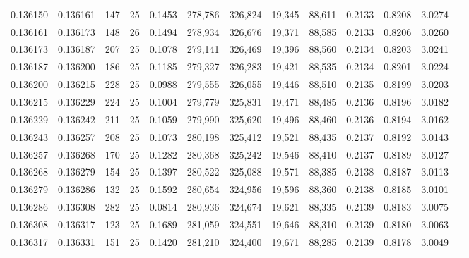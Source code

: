 \begin{tabular}{rrrrrrrrrrrrr}
0.136150 & 0.136161 &   147 &  25 &                                     0.1453 & 278,786 & 326,824 &  19,345 &  88,611 & 0.2133 & 0.8208 & 3.0274 \\
0.136161 & 0.136173 &   148 &  26 &                                     0.1494 & 278,934 & 326,676 &  19,371 &  88,585 & 0.2133 & 0.8206 & 3.0260 \\
0.136173 & 0.136187 &   207 &  25 &                                     0.1078 & 279,141 & 326,469 &  19,396 &  88,560 & 0.2134 & 0.8203 & 3.0241 \\
0.136187 & 0.136200 &   186 &  25 &                                     0.1185 & 279,327 & 326,283 &  19,421 &  88,535 & 0.2134 & 0.8201 & 3.0224 \\
0.136200 & 0.136215 &   228 &  25 &                                     0.0988 & 279,555 & 326,055 &  19,446 &  88,510 & 0.2135 & 0.8199 & 3.0203 \\
0.136215 & 0.136229 &   224 &  25 &                                     0.1004 & 279,779 & 325,831 &  19,471 &  88,485 & 0.2136 & 0.8196 & 3.0182 \\
0.136229 & 0.136242 &   211 &  25 &                                     0.1059 & 279,990 & 325,620 &  19,496 &  88,460 & 0.2136 & 0.8194 & 3.0162 \\
0.136243 & 0.136257 &   208 &  25 &                                     0.1073 & 280,198 & 325,412 &  19,521 &  88,435 & 0.2137 & 0.8192 & 3.0143 \\
0.136257 & 0.136268 &   170 &  25 &                                     0.1282 & 280,368 & 325,242 &  19,546 &  88,410 & 0.2137 & 0.8189 & 3.0127 \\
0.136268 & 0.136279 &   154 &  25 &                                     0.1397 & 280,522 & 325,088 &  19,571 &  88,385 & 0.2138 & 0.8187 & 3.0113 \\
0.136279 & 0.136286 &   132 &  25 &                                     0.1592 & 280,654 & 324,956 &  19,596 &  88,360 & 0.2138 & 0.8185 & 3.0101 \\
0.136286 & 0.136308 &   282 &  25 &                                     0.0814 & 280,936 & 324,674 &  19,621 &  88,335 & 0.2139 & 0.8183 & 3.0075 \\
0.136308 & 0.136317 &   123 &  25 &                                     0.1689 & 281,059 & 324,551 &  19,646 &  88,310 & 0.2139 & 0.8180 & 3.0063 \\
0.136317 & 0.136331 &   151 &  25 &                                     0.1420 & 281,210 & 324,400 &  19,671 &  88,285 & 0.2139 & 0.8178 & 3.0049 \\

\end{tabular}
